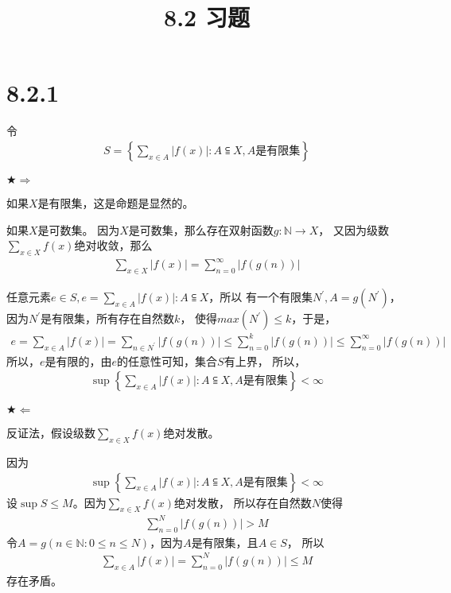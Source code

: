 \documentclass{article}
\theoremstyle{mystyle}
\begin{document}
\title{8.2 习题}
\maketitle

\section*{8.2.1}

令
\begin{align*}
  S = \left \{ \sum \limits_{x \in A} |f(x)|: A \subseteqq X , A \text{是有限集} \right \}
\end{align*}

$\bigstar \Rightarrow$

如果$X$是有限集，这是命题是显然的。

如果$X$是可数集。
因为$X$是可数集，那么存在双射函数$g: \mathbb{N} \rightarrow X $，
又因为级数$\sum \limits_{x \in X}f(x)$绝对收敛，那么
\begin{align*}
  \sum \limits_{x \in X} |f(x)| = \sum \limits_{n=0}^\infty |f(g(n))|
\end{align*}

任意元素$e \in S, e = \sum \limits_{x \in A} |f(x)|: A \subseteqq X$，所以
有一个有限集$N^\prime, A = g(N^\prime)$，因为$N^\prime$是有限集，所有存在自然数$k$，
使得$max(N^\prime) \leq k$，于是，
\begin{align*}
  e = \sum \limits_{x \in A} |f(x)| = \sum \limits_{n \in N^\prime} |f(g(n))| \leq \sum \limits_{n=0}^k |f(g(n))| \leq \sum \limits_{n=0}^\infty |f(g(n))| 
\end{align*}
所以，$e$是有限的，由$e$的任意性可知，集合$S$有上界，
所以，
\begin{align*}
  \sup \left \{ \sum \limits_{x \in A} |f(x)|: A \subseteqq X , A \text{是有限集} \right \} < \infty
\end{align*}

$\bigstar \Leftarrow$

反证法，假设级数$\sum \limits_{x \in X}f(x)$绝对发散。

因为
\begin{align*}
  \sup \left \{ \sum \limits_{x \in A} |f(x)|: A \subseteqq X , A \text{是有限集} \right \} < \infty
\end{align*}
设$\sup S \leq M$。因为$\sum \limits_{x \in X}f(x)$绝对发散，
所以存在自然数$N$使得
\begin{align*}
  \sum \limits_{n=0}^N |f(g(n))| > M
\end{align*}
令$A = g({n \in \mathbb{N}: 0 \leq n \leq N})$，因为$A$是有限集，且$A \in S$，
所以
\begin{align*}
  \sum \limits_{x \in A} |f(x)| = \sum \limits_{n=0}^N |f(g(n))| \leq M
\end{align*}
存在矛盾。
\end{document}
